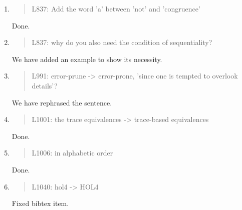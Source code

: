 \begin{enumerate}
\item \begin{quote}
    L837: Add the word 'a' between 'not' and 'congruence'
  \end{quote}
  Done.
  
\item \begin{quote}
    L837: why do you also need the condition of sequentiality?
  \end{quote}
  We have added an example to show its necessity.
  
\item \begin{quote}
    L991: error-prune -> error-prone, ’since one is tempted to overlook details’?
  \end{quote}
  We have rephrased the sentence.
  
\item \begin{quote}
    L1001: the trace equivalences -> trace-based equivalences
  \end{quote}
  Done.
  
\item \begin{quote}
    L1006: in alphabetic order
  \end{quote}
  Done.
  
\item \begin{quote}
    L1040: hol4 -> HOL4
  \end{quote}
  Fixed bibtex item.
  
\end{enumerate}

